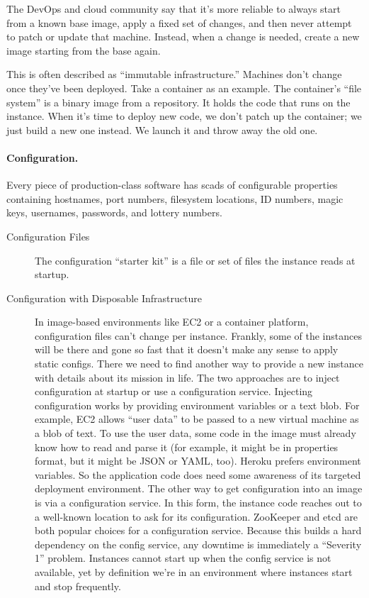 The DevOps and cloud community say that it’s more reliable to always start from a known base image, apply a fixed set of changes, and then never attempt to patch or update that machine. Instead, when a change is needed, create a new image starting from the base again.

This is often described as “immutable infrastructure.” Machines don’t change once they’ve been deployed. Take a container as an example. The container’s “file system” is a binary image from a repository. It holds the code that runs on the instance. When it’s time to deploy new code, we don’t patch up the container; we just build a new one instead. We launch it and throw away the old one.

\paragraph{Configuration.} Every piece of production-class software has scads of configurable properties containing hostnames, port numbers, filesystem locations, ID numbers, magic keys, usernames, passwords, and lottery numbers.

\begin{description}

\item [Configuration Files] The configuration “starter kit” is a file or set of files the instance reads at startup.

\item [Configuration with Disposable Infrastructure]  In image-based environments like EC2 or a container platform, configuration files can’t change per instance. Frankly, some of the instances will be there and gone so fast that it doesn’t make any sense to apply static configs. There we need to find another way to provide a new instance with details about its mission in life. The two approaches are to inject configuration at startup or use a configuration service. Injecting configuration works by providing environment variables or a text blob. For example, EC2 allows “user data” to be passed to a new virtual machine as a blob of text. To use the user data, some code in the image must already know how to read and parse it (for example, it might be in properties format, but it might be JSON or YAML, too). Heroku prefers environment variables. So the application code does need some awareness of its targeted deployment environment. The other way to get configuration into an image is via a configuration service. In this form, the instance code reaches out to a well-known location to ask for its configuration. ZooKeeper and etcd are both popular choices for a configuration service. Because this builds a hard dependency on the config service, any downtime is immediately a “Severity 1” problem. Instances cannot start up when the config service is not available, yet by definition we’re in an environment where instances start and stop frequently.

\end{description}

